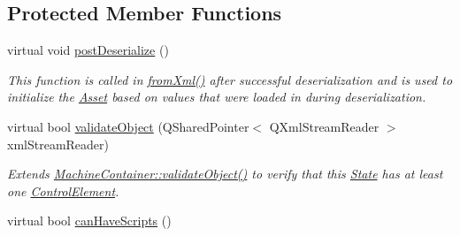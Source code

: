 \subsection*{Protected Member Functions}
\begin{DoxyCompactItemize}
\item 
virtual void \hyperlink{class_picto_1_1_state_a8e789d2395df4d047a278f3c09716468}{post\-Deserialize} ()
\begin{DoxyCompactList}\small\item\em This function is called in \hyperlink{class_picto_1_1_asset_a8bed4da09ecb1c07ce0dab313a9aba67}{from\-Xml()} after successful deserialization and is used to initialize the \hyperlink{class_picto_1_1_asset}{Asset} based on values that were loaded in during deserialization. \end{DoxyCompactList}\item 
\hypertarget{class_picto_1_1_state_a644ad6fdb5af053d31c8284fd81d4158}{virtual bool \hyperlink{class_picto_1_1_state_a644ad6fdb5af053d31c8284fd81d4158}{validate\-Object} (Q\-Shared\-Pointer$<$ Q\-Xml\-Stream\-Reader $>$ xml\-Stream\-Reader)}\label{class_picto_1_1_state_a644ad6fdb5af053d31c8284fd81d4158}

\begin{DoxyCompactList}\small\item\em Extends \hyperlink{class_picto_1_1_machine_container_a53ea9684c79a21ff959dfaf3a3bc73ae}{Machine\-Container\-::validate\-Object()} to verify that this \hyperlink{class_picto_1_1_state}{State} has at least one \hyperlink{class_picto_1_1_control_element}{Control\-Element}. \end{DoxyCompactList}\item 
\hypertarget{class_picto_1_1_state_a3acc28621f786ceb66d93e8504239c8b}{virtual bool \hyperlink{class_picto_1_1_state_a3acc28621f786ceb66d93e8504239c8b}{can\-Have\-Scripts} ()}\label{class_picto_1_1_state_a3acc28621f786ceb66d93e8504239c8b}


\end{DoxyCompactItemize}
